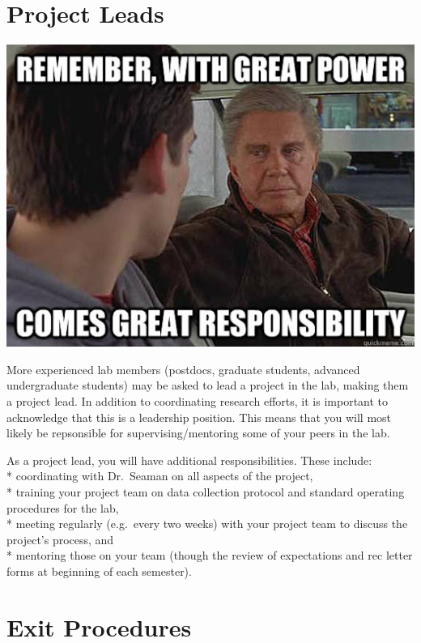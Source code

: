 \documentclass[]{book}
\begin{document}
\hypertarget{project-leads}{%
\section{Project Leads}\label{project-leads}}

\includegraphics{images/power.jpg}

More experienced lab members (postdocs, graduate students, advanced undergraduate students) may be asked to lead a project in the lab, making them a project lead. In addition to coordinating research efforts, it is important to acknowledge that this is a leadership position. This means that you will most likely be repsonsible for supervising/mentoring some of your peers in the lab.

As a project lead, you will have additional responsibilities. These include:\\
* coordinating with Dr.~Seaman on all aspects of the project,\\
* training your project team on data collection protocol and standard operating procedures for the lab,\\
* meeting regularly (e.g.~every two weeks) with your project team to discuss the project's process, and\\
* mentoring those on your team (though the review of expectations and rec letter forms at beginning of each semester).

\hypertarget{exit-procedures}{%
\section{Exit Procedures}\label{exit-procedures}}
\end{document}
